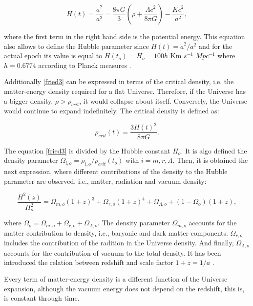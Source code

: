 \begin{equation}
H(t)=\frac{\dot{a}^2}{a^2}=\frac{8 \pi G}{3}\left(\rho+\frac{\Lambda c^2}{8\pi G}\right) -\frac{Kc^2}{a^2},
\label{fried3}
\end{equation}

where the first term in the right hand side is the potential energy. 
This equation also allows to define the Hubble parameter since $H(t)=\dot{a}^2/a^2$ and for the 
actual epoch its value is equal to $H(t_o)=H_o = 100h$ Km $s^{-1}$ $Mpc^{-1}$ where $h=0.6774$
according to Planck measures \cite{planck}. 

Additionally \ref{fried3} can be expressed in terms of the critical
density, i.e. the matter-energy density required for a flat Universe.
Therefore, if the Universe has a bigger density,
$\rho > \rho_{crit}$, it would collapse about itself. Conversely, the Universe would
continue to expand indefinitely. The critical density is defined as:

\[\rho_{crit}(t)= \frac{3H(t)^2}{8\pi G}.\]

The equation \ref{fried3} is divided by the Hubble constant $H_o$. It is algo defined
the density parameter  $\Omega_{i,o} = \rho_{i,o}/\rho_{crit}(t_o)$ 
with $i=m,r,\Lambda$. Then, it is obtained the next expression, where different 
contributions of the density to the Hubble parameter are observed, i.e., 
matter, radiation and vacuum density:

\begin{equation}
\frac{H^2(z)}{H_o^{2}}=\Omega_{m,o}\left(1+z\right)^3+
\Omega_{r,o}\left(1+z\right)^4+ \Omega_{\Lambda,o} + ( 1-\Omega_o )
\left(1+z\right),
\label{fried4}
\end{equation}


where $\Omega_o=\Omega_{m,o} +\Omega_{r,o}+\Omega_{\Lambda,o}$.
The density parameter $\Omega_{m,o}$ accounts for the matter 
contribution to density, i.e., baryonic and dark matter components.
$\Omega_{r,o}$ includes the contribution of the radition in the
Universe density. And finally, $\Omega_{\Lambda,o}$ accounts 
for the contribution of vacuum to the total density. 
It has been introduced the relation between redshift and scale
factor $1+z=1/a$ \cite{padma}. 

Every term of matter-energy density 
is a different function of the Universe expansion, although the vacuum 
energy does not depend on the redshift, this is, is constant through time.

\

